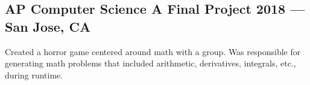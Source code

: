 \documentclass[../Resume.tex]{subfiles}
\begin{document}
	\subsection{AP Computer Science A Final Project \null\hfill 2018 --- San Jose, CA}
	\par Created a horror game centered around math with a group. Was responsible for generating math problems that included arithmetic, derivatives, integrals, etc., during runtime.
	\vspace*{-2mm}
\end{document}
